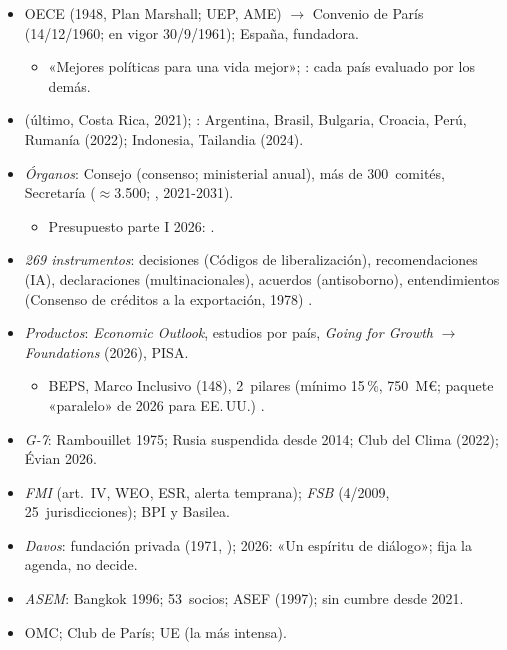 \documentclass{article}
\begin{document}
\begin{columnas}
\begin{itemize}
\item OECE (1948, Plan Marshall; UEP, AME) $\to$ Convenio de París (14/12/1960; en vigor 30/9/1961); España, fundadora.
  \begin{itemize}
  \item «Mejores políticas para una vida mejor»; : cada país evaluado por los demás.
  \end{itemize}
\item {} (último, Costa Rica, 2021); : Argentina, Brasil, Bulgaria, Croacia, Perú, Rumanía (2022); Indonesia, Tailandia (2024).
\item \emph{Órganos}: Consejo (consenso; ministerial anual), más de 300~comités, Secretaría ($\approx$3.500; , 2021-2031).
  \begin{itemize}
  \item Presupuesto parte I 2026: .
  \end{itemize}
\item \emph{269 instrumentos}: decisiones (Códigos de liberalización), recomendaciones (IA), declaraciones (multinacionales), acuerdos (antisoborno), entendimientos (Consenso de créditos a la exportación, 1978) .
\item \emph{Productos}: \emph{Economic Outlook}, estudios por país, \emph{Going for Growth} $\to$ \emph{Foundations} (2026), PISA.
  \begin{itemize}
  \item BEPS, Marco Inclusivo (148), 2~pilares (mínimo 15\,\%, 750~M€; paquete «paralelo» de 2026 para EE.\,UU.) .
  \end{itemize}
\end{itemize}
\begin{itemize}
\item \emph{G-7}: Rambouillet 1975; Rusia suspendida desde 2014; Club del Clima (2022); Évian 2026.
\item \emph{FMI} (art.~IV, WEO, ESR, alerta temprana); \emph{FSB} (4/2009, 25~jurisdicciones); BPI y Basilea.
\item \emph{Davos}: fundación privada (1971, ); 2026: «Un espíritu de diálogo»; fija la agenda, no decide.
\item \emph{ASEM}: Bangkok 1996; 53~socios; ASEF (1997); sin cumbre desde 2021.
\item OMC; Club de París; UE (la más intensa).
\end{itemize}


\end{columnas}
\end{document}
